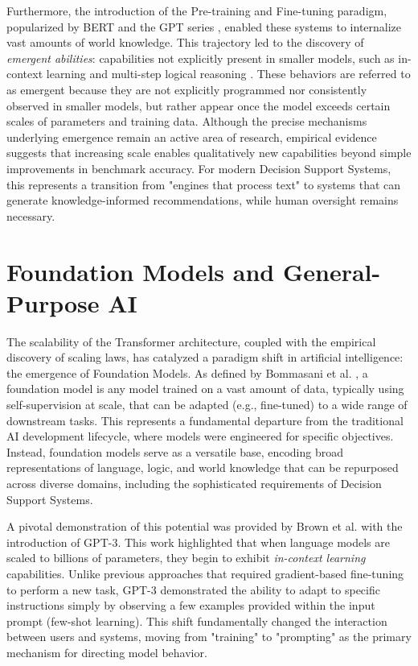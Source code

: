 Furthermore, the introduction of the Pre-training and Fine-tuning paradigm, popularized by BERT \cite{devlin2019bert} and the GPT series \cite{radford2019language}, enabled these systems to internalize vast amounts of world knowledge. This trajectory led to the discovery of \textit{emergent abilities}: capabilities not explicitly present in smaller models, such as in-context learning and multi-step logical reasoning \cite{wei2022emergent}.
These behaviors are referred to as emergent because they are not explicitly programmed nor consistently observed in smaller models, but rather appear once the model exceeds certain scales of parameters and training data. Although the precise mechanisms underlying emergence remain an active area of research, empirical evidence suggests that increasing scale enables qualitatively new capabilities beyond simple improvements in benchmark accuracy.
For modern Decision Support Systems, this represents a transition from "engines that process text" to systems that can generate knowledge-informed recommendations, while human oversight remains necessary.


\section{Foundation Models and General-Purpose AI}
\label{sec:foundation_models}

The scalability of the Transformer architecture, coupled with the empirical discovery of scaling laws, has catalyzed a paradigm shift in artificial intelligence: the emergence of Foundation Models. As defined by Bommasani et al. \cite{bommasani2021opportunities}, a foundation model is any model trained on a vast amount of data, typically using self-supervision at scale, that can be adapted (e.g., fine-tuned) to a wide range of downstream tasks. This represents a fundamental departure from the traditional AI development lifecycle, where models were engineered for specific objectives. Instead, foundation models serve as a versatile base, encoding broad representations of language, logic, and world knowledge that can be repurposed across diverse domains, including the sophisticated requirements of Decision Support Systems.

A pivotal demonstration of this potential was provided by Brown et al. \cite{brown2020language} with the introduction of GPT-3. This work highlighted that when language models are scaled to billions of parameters, they begin to exhibit \textit{in-context learning} capabilities. Unlike previous approaches that required gradient-based fine-tuning to perform a new task, GPT-3 demonstrated the ability to adapt to specific instructions simply by observing a few examples provided within the input prompt (few-shot learning). This shift fundamentally changed the interaction between users and systems, moving from "training" to "prompting" as the primary mechanism for directing model behavior.

